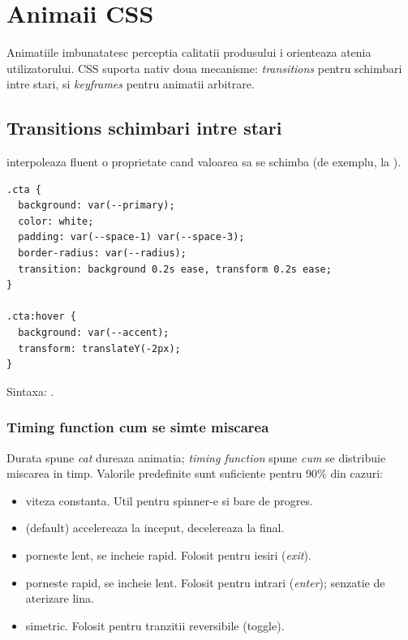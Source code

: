 \section{Animaii CSS}

Animatiile imbunatatesc perceptia calitatii produsului i orienteaza atenia utilizatorului. CSS suporta nativ doua mecanisme: \emph{transitions} pentru schimbari intre stari, si \emph{keyframes} pentru animatii arbitrare.

\subsection{Transitions \textendash{} schimbari intre stari}

 interpoleaza fluent o proprietate cand valoarea sa se schimba (de exemplu, la ).

\begin{lstlisting}[style=css, caption={Buton cu hover smooth}]
.cta {
  background: var(--primary);
  color: white;
  padding: var(--space-1) var(--space-3);
  border-radius: var(--radius);
  transition: background 0.2s ease, transform 0.2s ease;
}

.cta:hover {
  background: var(--accent);
  transform: translateY(-2px);
}
\end{lstlisting}

Sintaxa: .

\subsubsection{Timing function \textendash{} cum se simte miscarea}

Durata spune \emph{cat} dureaza animatia; \emph{timing function} spune \emph{cum} se distribuie miscarea in timp. Valorile predefinite sunt suficiente pentru 90\% din cazuri:

\begin{itemize}[itemsep=1pt]
  \item {} \textendash{} viteza constanta. Util pentru spinner-e si bare de progres.
  \item {} (default) \textendash{} accelereaza la inceput, decelereaza la final.
  \item {} \textendash{} porneste lent, se incheie rapid. Folosit pentru iesiri (\emph{exit}).
  \item {} \textendash{} porneste rapid, se incheie lent. Folosit pentru intrari (\emph{enter}); senzatie de aterizare lina.
  \item {} \textendash{} simetric. Folosit pentru tranzitii reversibile (toggle).
\end{itemize}

